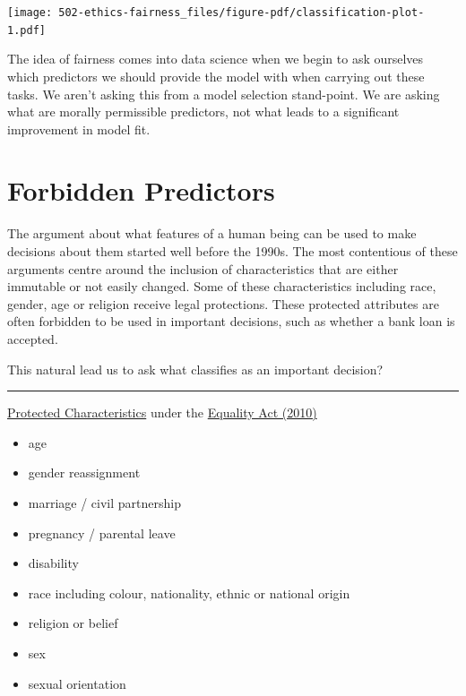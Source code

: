 \documentclass[
  letterpaper,
  DIV=11,
  numbers=noendperiod]{scrreprt}
\providecommand{\tightlist}{%
  \setlength{\itemsep}{0pt}\setlength{\parskip}{0pt}}\usepackage{longtable,booktabs,array}
\begin{document}
\begin{center}
\texttt{[image: 502-ethics-fairness\_files/figure-pdf/classification-plot-1.pdf]}
\end{center}

The idea of fairness comes into data science when we begin to ask
ourselves which predictors we should provide the model with when
carrying out these tasks. We aren't asking this from a model selection
stand-point. We are asking what are morally permissible predictors, not
what leads to a significant improvement in model fit.

\section{Forbidden Predictors}\label{forbidden-predictors}

The argument about what features of a human being can be used to make
decisions about them started well before the 1990s. The most contentious
of these arguments centre around the inclusion of characteristics that
are either immutable or not easily changed. Some of these
characteristics including race, gender, age or religion receive legal
protections. These protected attributes are often forbidden to be used
in important decisions, such as whether a bank loan is accepted.

This natural lead us to ask what classifies as an important decision?

\begin{center}\rule{0.5\linewidth}{0.5pt}\end{center}

\href{https://www.gov.uk/discrimination-your-rights}{Protected
Characteristics} under the
\href{https://www.legislation.gov.uk/ukpga/2010/15/contents}{Equality
Act (2010)}

\begin{itemize}
\tightlist
\item
  age
\item
  gender reassignment
\item
  marriage / civil partnership
\item
  pregnancy / parental leave
\item
  disability
\end{itemize}

\begin{itemize}
\tightlist
\item
  race including colour, nationality, ethnic or national origin
\item
  religion or belief
\item
  sex
\item
  sexual orientation
\end{itemize}
\end{document}
